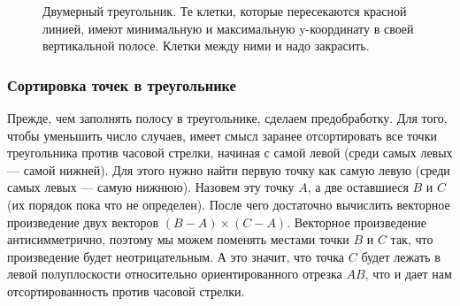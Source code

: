 \documentclass{article}
\begin{document}
\begin{center}
\begin{figure}[h]
\caption{Двумерный треугольник. Те клетки, которые пересекаются красной линией, имеют минимальную и максимальную y-координату в своей вертикальной полосе. Клетки между ними и надо закрасить.}
\label{ris:image}
\end{figure}\end{center}


\subsubsection{Сортировка точек в треугольнике}

Прежде, чем заполнять полосу в треугольнике, сделаем предобработку. Для того, чтобы уменьшить число случаев, имеет смысл заранее отсортировать все точки треугольника против часовой стрелки, начиная с самой левой (среди самых левых --- самой нижней). Для этого нужно найти первую точку как самую левую (среди самых левых --- самую нижнюю). Назовем эту точку $A$, а две оставшиеся $B$ и $C$ (их порядок пока что не определен). После чего достаточно вычислить векторное произведение двух векторов $(B - A) \times (C - A)$. Векторное произведение антисимметрично, поэтому мы можем поменять местами точки $B$ и $C$ так, что произведение будет неотрицательным. А это значит, что точка $C$ будет лежать в левой полуплоскости относительно ориентированного отрезка $AB$, что и дает нам отсортированность против часовой стрелки.
\end{document}
